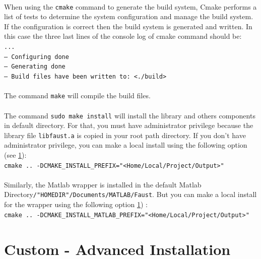 \paragraph{}When using the \texttt{cmake} command to generate the build system, Cmake performs a list of tests to determine the system configuration and manage the build system. If the configuration is correct then the build system is generated and written. In this case the three last lines of the console log of cmake command should be: \\
\texttt{... \\
-- Configuring done \\
-- Generating done \\
-- Build files have been written to: <./build>}

\paragraph{}The command \texttt{make} will compile the build files.

\paragraph{}The command \texttt{sudo make install} will install the library and others components in default directory. For that, you must have administrator privilege because the library file \texttt{libfaust.a} is copied in your root path directory. If you don't have administrator privilege, you can make a local install using the following option (see \ref{sec:UnixCustomInstall}): \\
\texttt{cmake .. -DCMAKE\_INSTALL\_PREFIX="<Home/Local/Project/Output>"}

\paragraph{}Similarly, the Matlab wrapper is installed in the default Matlab Directory\newline  \texttt{/"HOMEDIR"/Documents/MATLAB/Faust}. But you can make a local install for the wrapper using the following option \ref{sec:UnixCustomInstall}) : \\

\texttt{cmake .. -DCMAKE\_INSTALL\_MATLAB\_PREFIX="<Home/Local/Project/Output>"} 

\section{Custom - Advanced Installation}\label{sec:UnixCustomInstall}

